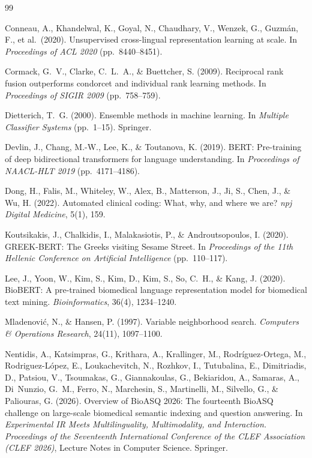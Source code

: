 \begin{thebibliography}{99}

Conneau, A., Khandelwal, K., Goyal, N., Chaudhary, V., Wenzek, G., Guzm\'{a}n, F., et al.\ (2020).
Unsupervised cross-lingual representation learning at scale.
In \textit{Proceedings of ACL 2020} (pp.\ 8440--8451).

Cormack, G.~V., Clarke, C.~L.~A., \& Buettcher, S. (2009).
Reciprocal rank fusion outperforms condorcet and individual rank learning methods.
In \textit{Proceedings of SIGIR 2009} (pp.\ 758--759).

Dietterich, T.~G. (2000).
Ensemble methods in machine learning.
In \textit{Multiple Classifier Systems} (pp.\ 1--15). Springer.

Devlin, J., Chang, M.-W., Lee, K., \& Toutanova, K. (2019).
BERT: Pre-training of deep bidirectional transformers for language understanding.
In \textit{Proceedings of NAACL-HLT 2019} (pp.\ 4171--4186).

Dong, H., Falis, M., Whiteley, W., Alex, B., Matterson, J., Ji, S., Chen, J., \& Wu, H. (2022).
Automated clinical coding: What, why, and where we are?
\textit{npj Digital Medicine}, 5(1), 159.

Koutsikakis, J., Chalkidis, I., Malakasiotis, P., \& Androutsopoulos, I. (2020).
GREEK-BERT: The Greeks visiting Sesame Street.
In \textit{Proceedings of the 11th Hellenic Conference on Artificial Intelligence} (pp.\ 110--117).

Lee, J., Yoon, W., Kim, S., Kim, D., Kim, S., So, C.~H., \& Kang, J. (2020).
BioBERT: A pre-trained biomedical language representation model for biomedical text mining.
\textit{Bioinformatics}, 36(4), 1234--1240.

Mladenovi\'{c}, N., \& Hansen, P. (1997).
Variable neighborhood search.
\textit{Computers \& Operations Research}, 24(11), 1097--1100.

Nentidis, A., Katsimpras, G., Krithara, A., Krallinger, M., Rodr\'{i}guez-Ortega, M., Rodriguez-L\'{o}pez, E., Loukachevitch, N., Rozhkov, I., Tutubalina, E., Dimitriadis, D., Patsiou, V., Tsoumakas, G., Giannakoulas, G., Bekiaridou, A., Samaras, A., Di~Nunzio, G.~M., Ferro, N., Marchesin, S., Martinelli, M., Silvello, G., \& Paliouras, G. (2026).
Overview of BioASQ 2026: The fourteenth BioASQ challenge on large-scale biomedical semantic indexing and question answering.
In \textit{Experimental IR Meets Multilinguality, Multimodality, and Interaction. Proceedings of the Seventeenth International Conference of the CLEF Association (CLEF 2026)}, Lecture Notes in Computer Science. Springer.


\end{thebibliography}
